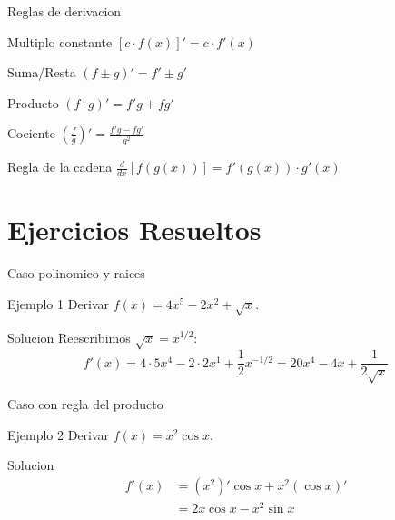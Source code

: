 \documentclass[aspectratio=169, 10pt, xcolor=table]{beamer}
\begin{document}
\begin{frame}{Reglas de derivacion}
    \begin{block}{Multiplo constante}
        $[c\cdot f(x)]' = c \cdot f'(x)$
    \end{block}
    \begin{block}{Suma/Resta}
        $(f \pm g)' = f' \pm g'$
    \end{block}
    \begin{block}{Producto}
        $(f\cdot g)' = f'g + fg'$
    \end{block}
    \begin{block}{Cociente}
        $\left(\frac{f}{g}\right)' = \frac{f'g - fg'}{g^2}$
    \end{block}
    \begin{block}{Regla de la cadena}
        $\frac{d}{dx}[f(g(x))] = f'(g(x)) \cdot g'(x)$
    \end{block}
\end{frame}

\section{Ejercicios Resueltos}

\begin{frame}{Caso polinomico y raices}
    \begin{exampleblock}{Ejemplo 1}
        Derivar $f(x) = 4x^5 - 2x^2 + \sqrt{x}$.
    \end{exampleblock}
    \begin{block}{Solucion}
        Reescribimos $\sqrt{x}=x^{1/2}$:
        \[
        f'(x) = 4\cdot5x^4 - 2\cdot2x^1 + \frac{1}{2}x^{-1/2}
        = 20x^4 - 4x + \frac{1}{2\sqrt{x}}
        \]
    \end{block}
\end{frame}

\begin{frame}{Caso con regla del producto}
    \begin{exampleblock}{Ejemplo 2}
        Derivar $f(x) = x^2 \cos x$.
    \end{exampleblock}
    \begin{block}{Solucion}
        \begin{align*}
            f'(x) &= (x^2)'\cos x + x^2(\cos x)' \\
            &= 2x\cos x - x^2\sin x
        \end{align*}
    \end{block}
\end{frame}
\end{document}
